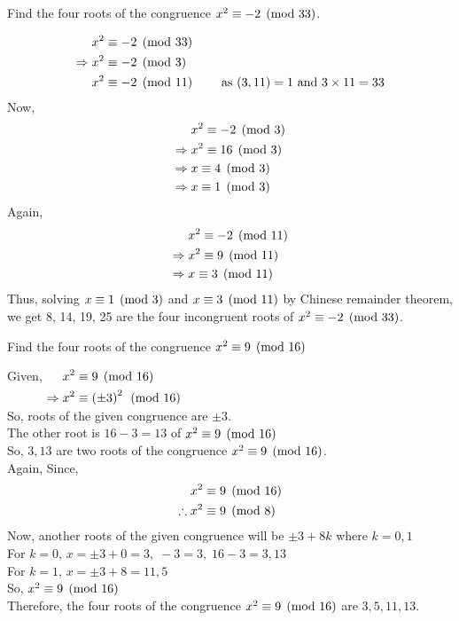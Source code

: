 \documentclass[12pt,class=book,crop=false]{standalone}
\begin{document}
\begin{qn}
    Find the four roots of the congruence $ x^2\equiv -2 \pmod{33} $.
\end{qn}
\begin{soln}
    \hfill
    \begin{align*}
        &x^2\equiv -2 \pmod{33}\\
        \Rightarrow\;&x^2\equiv -2 \pmod{3}\\
        &x^2\equiv -2 \pmod{11}\qquad\text{ as }(3,11)=1\text{ and }3\times11=33
    \end{align*}
    Now, 
    \begin{align*}
        &x^2\equiv -2 \pmod{3}\\
        \Rightarrow\;&x^2\equiv 16 \pmod{3}\\
        \Rightarrow\;&x\equiv 4 \pmod{3}\\
        \Rightarrow\;&x\equiv 1 \pmod{3}
    \end{align*}
    Again,
    \begin{align*}
        &x^2\equiv -2 \pmod{11}\\
        \Rightarrow\;&x^2\equiv 9 \pmod{11}\\
        \Rightarrow\;&x\equiv 3 \pmod{11}
    \end{align*}
    Thus, solving $ x\equiv 1 \pmod{3} $ and $ x\equiv 3 \pmod{11} $ by Chinese remainder theorem, we get 8, 14, 19, 25 are the four incongruent roots of $ x^2\equiv -2 \pmod{33} $.
\end{soln}
\begin{qn}
    Find the four roots of the congruence $ x^2\equiv 9 \pmod{16} $
\end{qn}
\begin{soln}
    Given, $ \begin{aligned}[t]
        & x^2\equiv 9 \pmod{16}\\
        \Rightarrow\; & x^2\equiv \left( \pm 3 \right)^2 \pmod{16}
    \end{aligned} $\\

    So, roots of the given congruence are $ \pm 3 $.\\
    The other root is $ 16-3=13 $ of $ x^2\equiv 9 \pmod{16} $\\
    So, $ 3,13 $ are two roots of the congruence $ x^2\equiv 9 \pmod{16} $.\\
    Again, Since,
    \begin{align*}
        & x^2\equiv 9 \pmod{16}\\
        \therefore\;& x^2\equiv 9 \pmod{8}
    \end{align*}
    Now, another roots of the given congruence will be $ \pm 3+8k $ where $ k=0,1 $\\
    For $ k=0 $, $ x=\pm3+0=3,\;-3=3,\;16-3=3,13 $\\
    For $ k=1 $, $ x=\pm3+8=11,5 $\\
    So, $ x^2\equiv 9 \pmod{16} $\\
    Therefore, the four roots of the congruence $ x^2\equiv 9 \pmod{16} $ are $ 3,5,11,13 $.
\end{soln}
\end{document}
